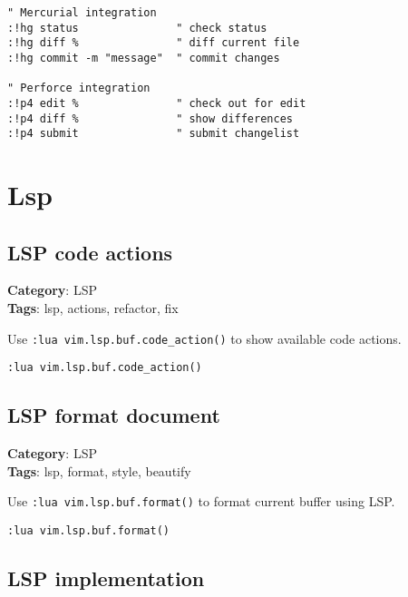 {{{{{{\begin{Exa*}{}
\begin{Verbatim}[fontsize=\footnotesize, breaklines, breakanywhere]
" Mercurial integration
:!hg status               " check status
:!hg diff %               " diff current file
:!hg commit -m "message"  " commit changes

" Perforce integration
:!p4 edit %               " check out for edit
:!p4 diff %               " show differences
:!p4 submit               " submit changelist
\end{Verbatim}
\end{Exa*}

\chapter{Lsp}
\section{LSP code actions}

\textbf{Category}: LSP\\ \textbf{Tags}: lsp, actions, refactor, fix
\vspace{0.5cm}

Use {\footnotesize \Verb§:lua vim.lsp.buf.code_action()§} to show available code actions.

\begin{Exa*}{}
\begin{Verbatim}[fontsize=\footnotesize, breaklines, breakanywhere]
:lua vim.lsp.buf.code_action()
\end{Verbatim}
\end{Exa*}

\section{LSP format document}

\textbf{Category}: LSP\\ \textbf{Tags}: lsp, format, style, beautify
\vspace{0.5cm}

Use {\footnotesize \Verb§:lua vim.lsp.buf.format()§} to format current buffer using LSP.

\begin{Exa*}{}
\begin{Verbatim}[fontsize=\footnotesize, breaklines, breakanywhere]
:lua vim.lsp.buf.format()
\end{Verbatim}
\end{Exa*}

\section{LSP implementation}

}}}}}}
